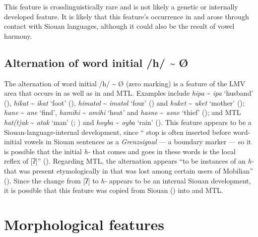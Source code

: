 \documentclass[output=paper]{LSP/langsci}
\begin{document}
This feature is crosslinguistically rare and is not likely a genetic or internally developed feature. It is likely that this feature’s occurrence in  and  arose through contact with Siouan languages, although it could also be the result of vowel harmony. 

\subsection{Alternation of word initial /h/ \textasciitilde{} Ø}

The alternation of word initial /h/ \textasciitilde{} Ø (zero marking) is a feature of the LMV area that occurs in  as well as in  and MTL. Examples include  \emph{hipa} \textasciitilde{} \emph{ipa} `husband' (\citealt[42]{GatschetSwanton1932}), \emph{hikat} \textasciitilde{} \emph{ikat} `foot' (\citealt[40]{GatschetSwanton1932}), \emph{himatol} \textasciitilde{} \emph{imatol} `four' (\citealt[41]{GatschetSwanton1932}) and \emph{huket} \textasciitilde{} \emph{uket} `mother' (\citealt[46]{GatschetSwanton1932});  \emph{hane} \textasciitilde{} \emph{ane} `find', \emph{hamihi} \textasciitilde{} \emph{amihi} `heat' and \emph{hasne} \textasciitilde{} \emph{asne} `thief' (\citealt[3]{DorseySwanton1912}); and MTL \emph{hat(t)ak} \textasciitilde{} \emph{atak} `man' (\citealt[88]{Crawford1978}; \citealt[295]{Drechsel1996}) and \emph{hoyba} \textasciitilde{} \emph{oyba} `rain' (\citealt[306]{Drechsel1996}). This feature appears to be a Siouan-language-internal development, since “ stop is often inserted before word-initial vowels in Siouan sentences as a \textit{Grenzsignal} — a boundary marker — so it is possible that the  initial \emph{h-} that comes and goes in these words is the local reflex of [ʔ]”  (\citealt[3]{Rankin2011}). Regarding MTL, the alternation appears “to be instances of an \emph{h-} that was present etymologically in  that was lost among certain users of Mobilian” (\citealt[3]{Rankin2011}). Since the change from [ʔ] to \emph{h-} appears to be an internal Siouan development, it is possible that this feature was copied from Siouan () into  and MTL. 

\section{Morphological features}
\end{document}
